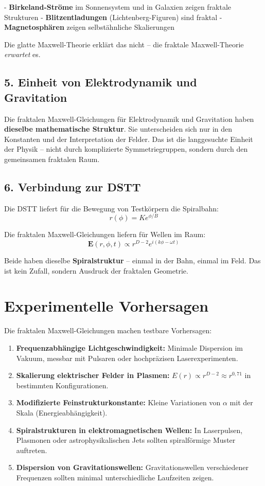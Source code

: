 \documentclass[12pt,a4paper]{article}
\begin{document}
- \textbf{Birkeland-Ströme} im Sonnensystem und in Galaxien zeigen fraktale Strukturen
- \textbf{Blitzentladungen} (Lichtenberg-Figuren) sind fraktal
- \textbf{Magnetosphären} zeigen selbstähnliche Skalierungen

Die glatte Maxwell-Theorie erklärt das nicht – die fraktale Maxwell-Theorie \textit{erwartet} es.

\subsection{5. Einheit von Elektrodynamik und Gravitation}

Die fraktalen Maxwell-Gleichungen für Elektrodynamik und Gravitation haben \textbf{dieselbe mathematische Struktur}. Sie unterscheiden sich nur in den Konstanten und der Interpretation der Felder. Das ist die langgesuchte Einheit der Physik – nicht durch komplizierte Symmetriegruppen, sondern durch den gemeinsamen fraktalen Raum.

\subsection{6. Verbindung zur DSTT}

Die DSTT liefert für die Bewegung von Testkörpern die Spiralbahn:
\[
r(\phi) = K e^{\phi/B} \tag{16}
\]

Die fraktalen Maxwell-Gleichungen liefern für Wellen im Raum:
\[
\mathbf{E}(r, \phi, t) \propto r^{D-2} e^{i(k\phi - \omega t)} \tag{17}
\]

Beide haben dieselbe \textbf{Spiralstruktur} – einmal in der Bahn, einmal im Feld. Das ist kein Zufall, sondern Ausdruck der fraktalen Geometrie.

\section{Experimentelle Vorhersagen}

Die fraktalen Maxwell-Gleichungen machen testbare Vorhersagen:

\begin{enumerate}
    \item \textbf{Frequenzabhängige Lichtgeschwindigkeit:} Minimale Dispersion im Vakuum, messbar mit Pulsaren oder hochpräzisen Laserexperimenten.
    
    \item \textbf{Skalierung elektrischer Felder in Plasmen:} \(E(r) \propto r^{D-2} \approx r^{0,71}\) in bestimmten Konfigurationen.
    
    \item \textbf{Modifizierte Feinstrukturkonstante:} Kleine Variationen von \(\alpha\) mit der Skala (Energieabhängigkeit).
    
    \item \textbf{Spiralstrukturen in elektromagnetischen Wellen:} In Laserpulsen, Plasmonen oder astrophysikalischen Jets sollten spiralförmige Muster auftreten.
    
    \item \textbf{Dispersion von Gravitationswellen:} Gravitationswellen verschiedener Frequenzen sollten minimal unterschiedliche Laufzeiten zeigen.
\end{enumerate}
\end{document}

